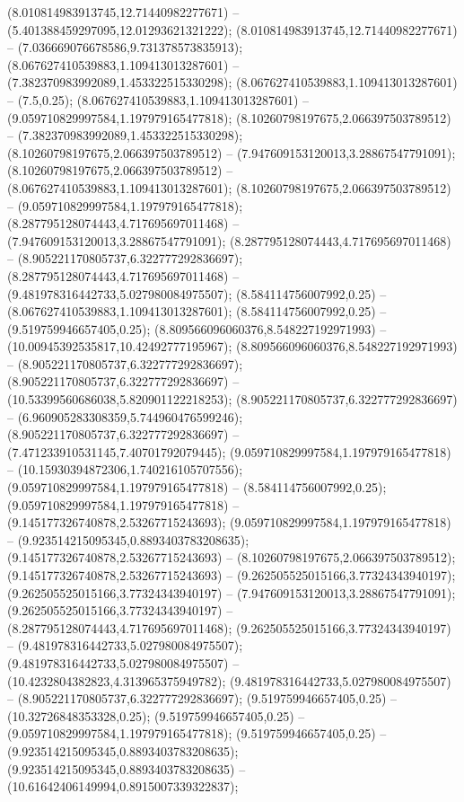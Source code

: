  (8.010814983913745,12.71440982277671) -- (5.401388459297095,12.01293621321222);
 (8.010814983913745,12.71440982277671) -- (7.036669076678586,9.731378573835913);
 (8.067627410539883,1.109413013287601) -- (7.382370983992089,1.453322515330298);
 (8.067627410539883,1.109413013287601) -- (7.5,0.25);
 (8.067627410539883,1.109413013287601) -- (9.059710829997584,1.197979165477818);
 (8.10260798197675,2.066397503789512) -- (7.382370983992089,1.453322515330298);
 (8.10260798197675,2.066397503789512) -- (7.947609153120013,3.28867547791091);
 (8.10260798197675,2.066397503789512) -- (8.067627410539883,1.109413013287601);
 (8.10260798197675,2.066397503789512) -- (9.059710829997584,1.197979165477818);
 (8.287795128074443,4.717695697011468) -- (7.947609153120013,3.28867547791091);
 (8.287795128074443,4.717695697011468) -- (8.905221170805737,6.322777292836697);
 (8.287795128074443,4.717695697011468) -- (9.481978316442733,5.027980084975507);
 (8.584114756007992,0.25) -- (8.067627410539883,1.109413013287601);
 (8.584114756007992,0.25) -- (9.519759946657405,0.25);
 (8.809566096060376,8.548227192971993) -- (10.00945392535817,10.42492777195967);
 (8.809566096060376,8.548227192971993) -- (8.905221170805737,6.322777292836697);
 (8.905221170805737,6.322777292836697) -- (10.53399560686038,5.820901122218253);
 (8.905221170805737,6.322777292836697) -- (6.960905283308359,5.744960476599246);
 (8.905221170805737,6.322777292836697) -- (7.471233910531145,7.40701792079445);
 (9.059710829997584,1.197979165477818) -- (10.15930394872306,1.740216105707556);
 (9.059710829997584,1.197979165477818) -- (8.584114756007992,0.25);
 (9.059710829997584,1.197979165477818) -- (9.145177326740878,2.53267715243693);
 (9.059710829997584,1.197979165477818) -- (9.923514215095345,0.8893403783208635);
 (9.145177326740878,2.53267715243693) -- (8.10260798197675,2.066397503789512);
 (9.145177326740878,2.53267715243693) -- (9.262505525015166,3.77324343940197);
 (9.262505525015166,3.77324343940197) -- (7.947609153120013,3.28867547791091);
 (9.262505525015166,3.77324343940197) -- (8.287795128074443,4.717695697011468);
 (9.262505525015166,3.77324343940197) -- (9.481978316442733,5.027980084975507);
 (9.481978316442733,5.027980084975507) -- (10.4232804382823,4.313965375949782);
 (9.481978316442733,5.027980084975507) -- (8.905221170805737,6.322777292836697);
 (9.519759946657405,0.25) -- (10.32726848353328,0.25);
 (9.519759946657405,0.25) -- (9.059710829997584,1.197979165477818);
 (9.519759946657405,0.25) -- (9.923514215095345,0.8893403783208635);
 (9.923514215095345,0.8893403783208635) -- (10.61642406149994,0.8915007339322837);
